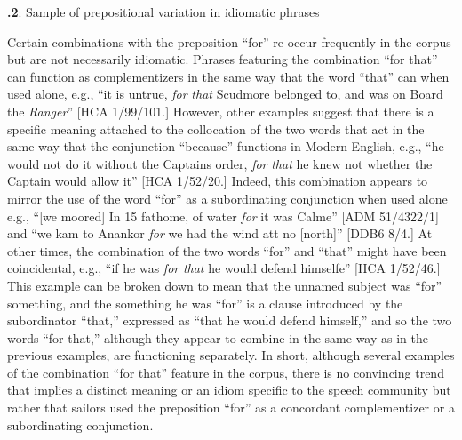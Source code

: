 \addtocounter{footnote}{-2}

\textbf{.2}: Sample of prepositional variation in idiomatic phrases

  Certain combinations with the preposition “for” re-occur frequently in the corpus but are not necessarily idiomatic. Phrases featuring the combination “for that” can function as complementizers in the same way that the word “that” can when used alone, e.g., “it is untrue, \textit{for} \textit{that} Scudmore belonged to, and was on Board the \textit{Ranger}” [HCA 1/99/101.] However, other examples suggest that there is a specific meaning attached to the collocation of the two words that act in the same way that the conjunction “because” functions in Modern English, e.g., “he would not do it without the Captains order, \textit{for} \textit{that} he knew not whether the Captain would allow it” [HCA 1/52/20.] Indeed, this combination appears to mirror the use of the word “for” as a subordinating conjunction when used alone e.g., “[we moored] In 15 fathome, of water \textit{for} it was Calme” [ADM 51/4322/1] and “we kam to Anankor \textit{for} we had the wind att no [north]” [DDB6 8/4.] At other times, the combination of the two words “for” and “that” might have been coincidental, e.g., “if he was \textit{for} \textit{that} he would defend himselfe” [HCA 1/52/46.] This example can be broken down to mean that the unnamed subject was “for” something, and the something he was “for” is a clause introduced by the subordinator “that,” expressed as “that he would defend himself,” and so the two words “for that,” although they appear to combine in the same way as in the previous examples, are functioning separately. In short, although several examples of the combination “for that” feature in the corpus, there is no convincing trend that implies a distinct meaning or an idiom specific to the speech community but rather that sailors used the preposition “for” as a concordant complementizer or a subordinating conjunction. 

